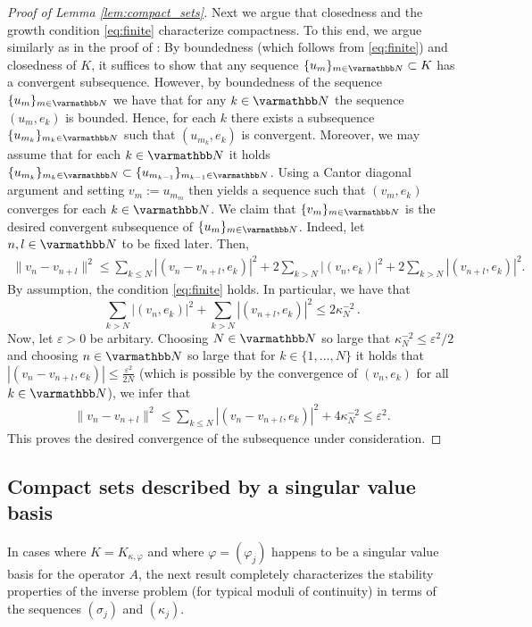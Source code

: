 \documentclass[12pt,twoside]{amsart}
\numberwithin{equation}{section}
\renewcommand{\leq}{\leqslant}
\newcommand{\eps}{\varepsilon}
\begin{document}
\begin{appendix}
\begin{proof}[Proof of Lemma \ref{lem:compact_sets}]
Next we argue that closedness and the growth condition \eqref{eq:finite} characterize compactness. To this end, we argue similarly as in the proof of \cite[Proposition 25]{Melrose}: By boundedness (which follows from \eqref{eq:finite}) and closedness of $K$, it suffices to show that any sequence $\{u_m \}_{m\in \N} \subset K$ has a convergent subsequence. However, by boundedness of the sequence $\{u_m\}_{m\in \N}$ we have that for any $k\in \N$ the sequence $(u_m, e_k)$ is bounded. Hence, for each $k$ there exists a subsequence $\{u_{m_k}\}_{m_k\in\N}$ such that $(u_{m_k}, e_k)$ is convergent. Moreover, we may assume that for each $k\in \N$ it holds $\{u_{m_k}\}_{m_k\in \N} \subset \{u_{m_{k-1}}\}_{m_{k-1}\in \N}$. Using a Cantor diagonal argument and setting $v_m:= u_{m_m}$ then yields a sequence such that $(v_m, e_k)$ converges for each $k\in \N$. We claim that $\{v_m\}_{m\in \N}$ is the desired convergent subsequence of $\{u_m\}_{m\in \N}$. Indeed, let $n,l \in\N$ to be fixed later. Then,
\begin{align*}
\|v_n - v_{n+l}\|^2 \leq \sum\limits_{k\leq N} |(v_n-v_{n+l}, e_k)|^2 + 2 \sum\limits_{k>N} |(v_n, e_k)|^2 + 2 \sum\limits_{k>N} |(v_{n+l}, e_k)|^2.
\end{align*}
By assumption, the condition \eqref{eq:finite} holds. In particular, we have that
$$\sum\limits_{k>N} |(v_n, e_k)|^2 + \sum\limits_{k>N} |(v_{n+l}, e_k)|^2 \leq 2 \kappa_N^{-2}\,.
$$
 Now, let $\eps>0$ be arbitary. Choosing $N\in \N$ so large that $\kappa_N^{-2}\leq \eps^2/2$ and choosing $n\in \N$ so large that for $k \in \{1, \dots, N\}$ it holds that $|(v_n-v_{n+l}, e_k)|\leq \frac{\eps^2}{2N}$ (which is possible by the convergence of $(v_n, e_k)$ for all $k\in \N$), we infer that
\begin{align*}
\|v_n - v_{n+l}\|^2 \leq \sum\limits_{k\leq N} |(v_n-v_{n+l}, e_k)|^2 + 4\kappa_N^{-2}
\leq \eps^2.
\end{align*}
This proves the desired convergence of the subsequence under consideration.
\end{proof}


\subsection{Compact sets described by a singular value basis}

In cases where $K = K_{\kappa,\varphi}$ and where $\varphi = (\varphi_j)$ happens to be a singular value basis for the operator $A$, the next result completely characterizes the stability properties of the inverse problem (for typical moduli of continuity) in terms of the sequences $(\sigma_j)$ and $(\kappa_j)$.


\end{appendix}
\end{document}
